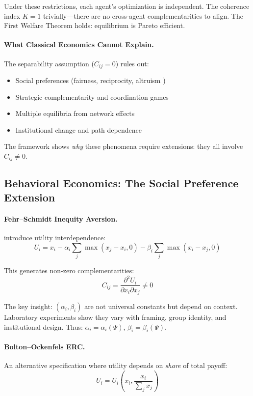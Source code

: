 Under these restrictions, each agent's optimization is independent.
The coherence index $K = 1$ trivially---there are no cross-agent complementarities to align.
The First Welfare Theorem holds: equilibrium is Pareto efficient.

\paragraph{What Classical Economics Cannot Explain.}
The separability assumption ($C_{ij} = 0$) rules out:
\begin{itemize}
  \item Social preferences (fairness, reciprocity, altruism \citep{fehrfischbacher2003})
  \item Strategic complementarity and coordination games
  \item Multiple equilibria from network effects
  \item Institutional change and path dependence
\end{itemize}

The framework shows \emph{why} these phenomena require extensions:
they all involve $C_{ij} \neq 0$.

\subsection{Behavioral Economics: The Social Preference Extension}

\paragraph{Fehr--Schmidt Inequity Aversion.}
\citet{fehrschmidt} introduce utility interdependence:
\begin{equation}
  U_i = x_i - \alpha_i \sum_{j} \max(x_j - x_i, 0) - \beta_i \sum_{j} \max(x_i - x_j, 0)
\end{equation}

This generates non-zero complementarities:
\begin{equation}
  C_{ij} = \frac{\partial^2 U_i}{\partial x_i \partial x_j} \neq 0
\end{equation}

The key insight: $(\alpha_i, \beta_i)$ are not universal constants but depend on context.
Laboratory experiments show they vary with framing, group identity, and institutional design.
Thus: $\alpha_i = \alpha_i(\Psi)$, $\beta_i = \beta_i(\Psi)$.

\paragraph{Bolton--Ockenfels ERC.}
An alternative specification where utility depends on \emph{share} of total payoff:
\begin{equation}
  U_i = U_i\left(x_i, \frac{x_i}{\sum_j x_j}\right)
\end{equation}

